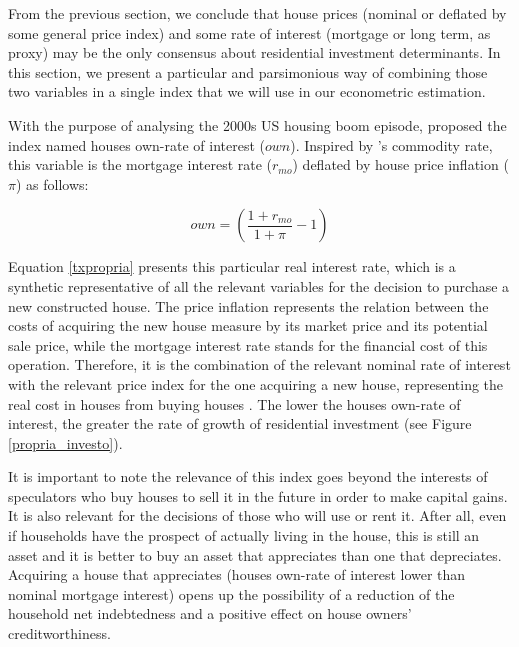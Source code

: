 \documentclass[12pt, a4paper]{article}
\begin{document}
From the previous section, we conclude that house prices (nominal or deflated by some general price index) and some rate of interest (mortgage or long term, as proxy) may be the only consensus about residential investment determinants.
In this section, we present a particular and parsimonious way of combining those two variables  in a single index that we will use in our econometric estimation.


With the purpose of analysing the 2000s US housing boom episode, \textcite{teixeira_crescimento_2015}  proposed the index named houses own-rate of interest (\(own\)).
Inspired by \citeauthor*{sraffaDrHayekMoney1932}'s \citeyear{sraffaDrHayekMoney1932} commodity rate, this variable is the mortgage interest rate (\(r_{mo}\)) deflated by house price inflation (\(\pi\)) as follows:
\begin{latex}
\begin{equation}
\label{txpropria}
own =  \left(\frac{1+r_{mo}}{1+\pi} - 1\right)
\end{equation}
\end{latex}


Equation \ref{txpropria} presents this particular real interest rate, which is a synthetic representative of all the relevant variables for the decision to purchase a new constructed house.
The price inflation represents the relation between the costs of acquiring the new house measure by its market price and its potential sale price, while the mortgage interest rate stands for the financial cost of this operation.
Therefore, it is the combination of the relevant nominal rate of interest with the relevant price index for the one acquiring a new house, representing the real cost in houses from buying houses \cite[p.~53]{teixeira_crescimento_2015}.
The lower the houses own-rate of interest, the greater the rate of growth of residential investment (see Figure \ref{propria_investo}).


It is important to note the relevance of this index goes beyond the interests of speculators who buy houses to sell it in the future in order to make capital gains.
It is also relevant for the decisions of those who will use or rent it.
After all, even if households have the prospect of actually living in the house, this is still an asset and it is better to buy an asset that appreciates  than one that depreciates.
Acquiring a house that appreciates (houses own-rate of interest lower than nominal mortgage interest) opens up the possibility of a reduction of the household net indebtedness and a positive effect on house owners’ creditworthiness.
\end{document}
